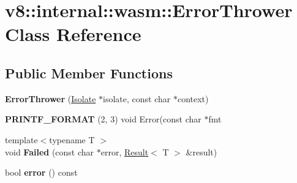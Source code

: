 \hypertarget{classv8_1_1internal_1_1wasm_1_1_error_thrower}{}\section{v8\+:\+:internal\+:\+:wasm\+:\+:Error\+Thrower Class Reference}
\label{classv8_1_1internal_1_1wasm_1_1_error_thrower}
\subsection*{Public Member Functions}
\begin{DoxyCompactItemize}
\item 
{\bfseries Error\+Thrower} (\hyperlink{classv8_1_1internal_1_1_isolate}{Isolate} $\ast$isolate, const char $\ast$context)\hypertarget{classv8_1_1internal_1_1wasm_1_1_error_thrower_a40b7f5857ec747c0e182b75a8875f71e}{}\label{classv8_1_1internal_1_1wasm_1_1_error_thrower_a40b7f5857ec747c0e182b75a8875f71e}

\item 
{\bfseries P\+R\+I\+N\+T\+F\+\_\+\+F\+O\+R\+M\+AT} (2, 3) void Error(const char $\ast$fmt\hypertarget{classv8_1_1internal_1_1wasm_1_1_error_thrower_afde1ed96e2033411df185bb669810740}{}\label{classv8_1_1internal_1_1wasm_1_1_error_thrower_afde1ed96e2033411df185bb669810740}

\item 
{\footnotesize template$<$typename T $>$ }\\void {\bfseries Failed} (const char $\ast$error, \hyperlink{structv8_1_1internal_1_1wasm_1_1_result}{Result}$<$ T $>$ \&result)\hypertarget{classv8_1_1internal_1_1wasm_1_1_error_thrower_a7913dc3cca9e9b716feb7c1faf6fe411}{}\label{classv8_1_1internal_1_1wasm_1_1_error_thrower_a7913dc3cca9e9b716feb7c1faf6fe411}

\item 
bool {\bfseries error} () const \hypertarget{classv8_1_1internal_1_1wasm_1_1_error_thrower_a6837932f21a6ca7a3b942064e7fe56dc}{}\label{classv8_1_1internal_1_1wasm_1_1_error_thrower_a6837932f21a6ca7a3b942064e7fe56dc}

\end{DoxyCompactItemize}
